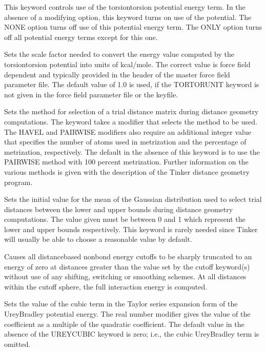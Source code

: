 \documentclass[letterpaper,11pt,english]{sphinxmanual}
\begin{document}
  This keyword controls use of the torsion\sphinxhyphen{}torsion potential energy term. In the absence of a modifying option, this keyword turns on use of the potential. The NONE option turns off use of this potential energy term. The ONLY option turns off all potential energy terms except for this one.

  Sets the scale factor needed to convert the energy value computed by the torsion\sphinxhyphen{}torsion potential into units of kcal/mole. The correct value is force field dependent and typically provided in the header of the master force field parameter file. The default value of 1.0 is used, if the TORTORUNIT keyword is not given in the force field parameter file or the keyfile.

  Sets the method for selection of a trial distance matrix during distance geometry computations. The keyword takes a modifier that selects the method to be used. The HAVEL and PAIRWISE modifiers also require an additional integer value that specifies the number of atoms used in metrization and the percentage of metrization, respectively. The default in the absence of this keyword is to use the PAIRWISE method with 100 percent metrization. Further information on the various methods is given with the description of the Tinker distance geometry program.

  Sets the initial value for the mean of the Gaussian distribution used to select trial distances between the lower and upper bounds during distance geometry computations. The value given must be between 0 and 1 which represent the lower and upper bounds respectively. This keyword is rarely needed since Tinker will usually be able to choose a reasonable value by default.

  Causes all distance\sphinxhyphen{}based nonbond energy cutoffs to be sharply truncated to an energy of zero at distances greater than the value set by the cutoff keyword(s) without use of any shifting, switching or smoothing schemes. At all distances within the cutoff sphere, the full interaction energy is computed.

  Sets the value of the cubic term in the Taylor series expansion form of the Urey\sphinxhyphen{}Bradley potential energy. The real number modifier gives the value of the coefficient as a multiple of the quadratic coefficient. The default value in the absence of the UREY\sphinxhyphen{}CUBIC keyword is zero; i.e., the cubic Urey\sphinxhyphen{}Bradley term is omitted.
\end{document}
